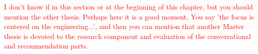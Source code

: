 \textcolor{red}{I don't know if in this section or at the beginning of this chapter, but you should mention the other thesis. Perhaps here it is a good moment. You say 'the focus is centered on the engineering...', and then you can mention that another Master thesis is devoted to the research component and evaluation of the conversational and recommendation parts.}

